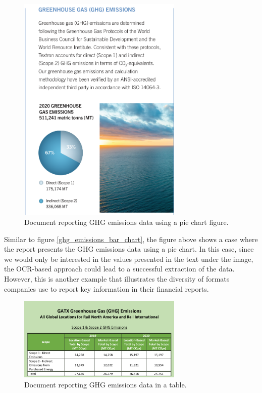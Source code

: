 \documentclass[english, 12pt, a4paper, elec, utf8, a-2b, online]{aaltothesis}
\begin{document}
\begin{figure}[H]
    \centering
    \includegraphics[width=0.7\textwidth]{images/ghg_emissions_pie_chart.png}
    \caption{Document reporting \ac{GHG} emissions data using a pie chart figure.}
    \label{ghg_emissions_pie_chart}
\end{figure}

Similar to figure \ref{ghg_emissions_bar_chart}, the figure above shows a case where the report presents the \ac{GHG} emissions data using a pie chart.
In this case, since we would only be interested in the values presented in the text under the image, the \ac{OCR}-based approach could lead to a successful extraction of the data.
However, this is another example that illustrates the diversity of formats companies use to report key information in their financial reports.

\begin{figure}[H]
    \centering
    \includegraphics[width=0.7\textwidth]{images/ghg_emissions_table.png}
    \caption{Document reporting \ac{GHG} emissions data in a table.}
    \label{ghg_emissions_table}
\end{figure}
\end{document}
